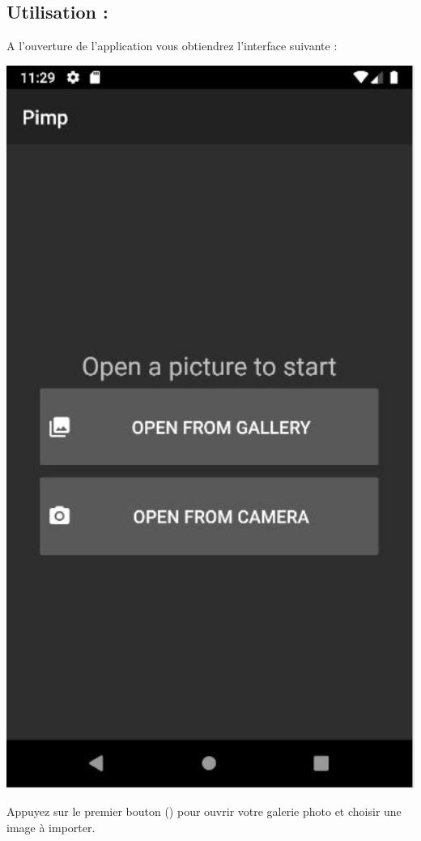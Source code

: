 \subsection{Utilisation :}
A l'ouverture de l'application vous obtiendrez l'interface suivante :
\begin{center}
    \begin{minipage}{.48\textwidth}
      \includegraphics[width=1\textwidth]{report_src/app_manual/first_activity_preview.JPG}
    \end{minipage}
    \begin{minipage}{.48\textwidth}
        Appuyez sur le premier bouton (\faPhoto) pour ouvrir votre galerie photo et choisir une image à importer.
        \\


\end{minipage}
\end{center}
